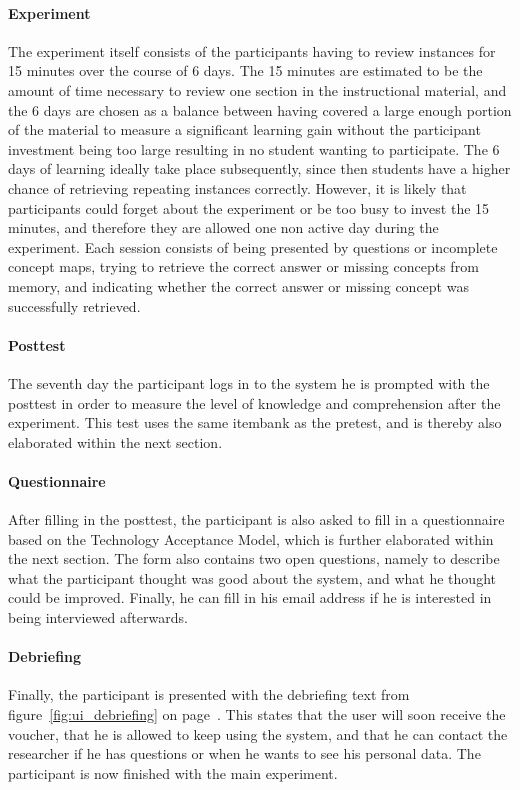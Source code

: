 \paragraph{Experiment} The experiment itself consists of the participants having to review instances for 15 minutes over the course of 6 days. The 15 minutes are estimated to be the amount of time necessary to review one section in the instructional material, and the 6 days are chosen as a balance between having covered a large enough portion of the material to measure a significant learning gain without the participant investment being too large resulting in no student wanting to participate. The 6 days of learning ideally take place subsequently, since then students have a higher chance of retrieving repeating instances correctly. However, it is likely that participants could forget about the experiment or be too busy to invest the 15 minutes, and therefore they are allowed one non active day during the experiment. Each session consists of being presented by questions or incomplete concept maps, trying to retrieve the correct answer or missing concepts from memory, and indicating whether the correct answer or missing concept was successfully retrieved.

\paragraph{Posttest} The seventh day the participant logs in to the system he is prompted with the posttest in order to measure the level of knowledge and comprehension after the experiment. This test uses the same itembank as the pretest, and is thereby also elaborated within the next section.

\paragraph{Questionnaire} After filling in the posttest, the participant is also asked to fill in a questionnaire based on the Technology Acceptance Model, which is further elaborated within the next section. The form also contains two open questions, namely to describe what the participant thought was good about the system, and what he thought could be improved. Finally, he can fill in his email address if he is interested in being interviewed afterwards.

\paragraph{Debriefing} Finally, the participant is presented with the debriefing text from figure~\ref{fig:ui_debriefing} on page~\pageref{fig:ui_debriefing}. This states that the user will soon receive the voucher, that he is allowed to keep using the system, and that he can contact the researcher if he has questions or when he wants to see his personal data. The participant is now finished with the main experiment.


